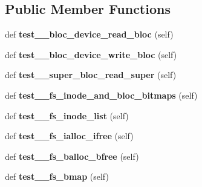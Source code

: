 \subsection*{Public Member Functions}
\begin{DoxyCompactItemize}
\item 
\hypertarget{classtester_1_1_minix_tester_ace7a146509eac31cfc0fc80de9403b08}{}def {\bfseries test\+\_\+\_\+bloc\+\_\+device\+\_\+read\+\_\+bloc} (self)\label{classtester_1_1_minix_tester_ace7a146509eac31cfc0fc80de9403b08}

\item 
\hypertarget{classtester_1_1_minix_tester_a24a380e585e1ee9c3305c238c83fb736}{}def {\bfseries test\+\_\+\_\+bloc\+\_\+device\+\_\+write\+\_\+bloc} (self)\label{classtester_1_1_minix_tester_a24a380e585e1ee9c3305c238c83fb736}

\item 
\hypertarget{classtester_1_1_minix_tester_ac80a8db66b10e26951f5b3dbb4ba6177}{}def {\bfseries test\+\_\+\_\+super\+\_\+bloc\+\_\+read\+\_\+super} (self)\label{classtester_1_1_minix_tester_ac80a8db66b10e26951f5b3dbb4ba6177}

\item 
\hypertarget{classtester_1_1_minix_tester_aea91283fb72bc66c47d112db5b9b0237}{}def {\bfseries test\+\_\+\_\+fs\+\_\+inode\+\_\+and\+\_\+bloc\+\_\+bitmaps} (self)\label{classtester_1_1_minix_tester_aea91283fb72bc66c47d112db5b9b0237}

\item 
\hypertarget{classtester_1_1_minix_tester_aa84f27bff9f41ed3507faee30ed19958}{}def {\bfseries test\+\_\+\_\+fs\+\_\+inode\+\_\+list} (self)\label{classtester_1_1_minix_tester_aa84f27bff9f41ed3507faee30ed19958}

\item 
\hypertarget{classtester_1_1_minix_tester_a486e61bd6413ac33f5d2589b1b5eff47}{}def {\bfseries test\+\_\+\_\+fs\+\_\+ialloc\+\_\+ifree} (self)\label{classtester_1_1_minix_tester_a486e61bd6413ac33f5d2589b1b5eff47}

\item 
\hypertarget{classtester_1_1_minix_tester_a138d86bcce3ab9464a9fae0397358b6d}{}def {\bfseries test\+\_\+\_\+fs\+\_\+balloc\+\_\+bfree} (self)\label{classtester_1_1_minix_tester_a138d86bcce3ab9464a9fae0397358b6d}

\item 
\hypertarget{classtester_1_1_minix_tester_a9f8509103647b8fec170dc9bd9995d3e}{}def {\bfseries test\+\_\+\_\+fs\+\_\+bmap} (self)\label{classtester_1_1_minix_tester_a9f8509103647b8fec170dc9bd9995d3e}


\end{DoxyCompactItemize}
